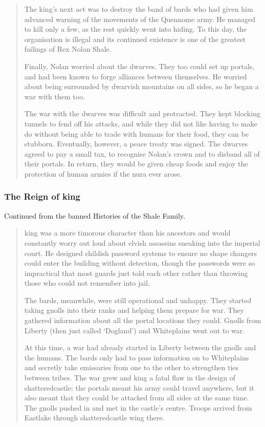 \begin{multicols}{2}
\begin{quotation}
  The king's next act was to destroy the band of bards who had given him advanced warning of the movements of the Quennome army.
  He managed to kill only a few, as the rest quickly went into hiding.
  To this day, the organisation is illegal and its continued existence is one of the greatest failings of Rex Nolan Shale.

  Finally, Nolan worried about the dwarves.
  They too could set up portals, and had been known to forge alliances between themselves.
  He worried about being surrounded by dwarvish mountains on all sides, so he began a war with them too.

  The war with the dwarves was difficult and protracted.
  They kept blocking tunnels to fend off his attacks, and while they did not like having to make do without being able to trade with humans for their food, they can be stubborn.
  Eventually, however, a peace treaty was signed.
  The dwarves agreed to pay a small tax, to recognise Nolan's crown and to disband all of their portals.
  In return, they would be given cheap foods and enjoy the protection of human armies if the nura ever arose.

\end{quotation}

\subsubsection{The Reign of \gls{king}}

Continued from the banned Histories of the Shale Family.

\begin{quotation}

  \Gls{king} was a more timorous character than his ancestors and would constantly worry out loud about elvish assassins sneaking into the imperial court.
  He designed childish password systems to ensure no shape changers could enter the building without detection, though the passwords were so impractical that most guards just told each other rather than throwing those who could not remember into jail.

  The bards, meanwhile, were still operational and unhappy.
  They started taking gnolls into their ranks and helping them prepare for war.
  They gathered information about all the portal locations they could.
  Gnolls from Liberty (then just called `Dogland') and Whiteplains went out to war.

  At this time, a war had already started in Liberty between the gnolls and the humans.
  The bards only had to pass information on to Whiteplains and secretly take emissaries from one to the other to strengthen ties between tribes.
  The war grew and \gls{king} a fatal flaw in the design of \gls{shatteredcastle}: the portals meant his army could travel anywhere, but it also meant that they could be attacked from all sides at the same time.
  The gnolls pushed in and met in the castle's centre.
  Troops arrived from Eastlake through \gls{shatteredcastle} wing there.


\end{quotation}
\end{multicols}
